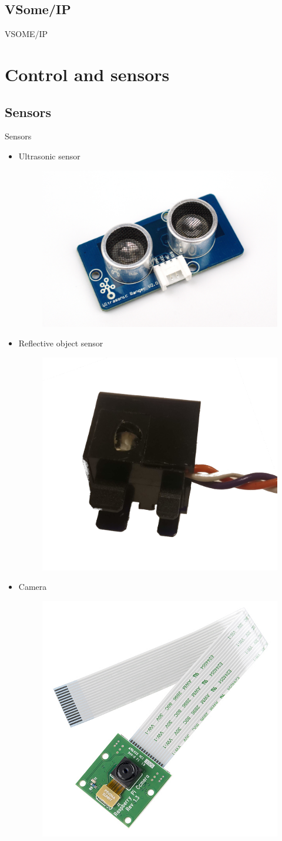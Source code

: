 \documentclass{beamer}
\begin{document}
\subsection{VSome/IP}
\begin{frame}{VSOME/IP}
    
\end{frame}

\section{Control and sensors }
\subsection{Sensors}

\begin{frame}{Sensors}
    \begin{itemize}
     \item Ultrasonic sensor
    \begin{figure}
        \includegraphics[width=0.2\linewidth, left]{ultrasonic.jpg}
    \end{figure}
    \item Reflective object sensor
    \begin{figure}
        \includegraphics[width=0.2\linewidth, left]{ir.jpg}
    \end{figure}
    \item Camera
    \begin{figure}
        \includegraphics[width=0.2\linewidth, left]{camera.jpg}
    \end{figure}

    \end{itemize}

\end{frame}
\end{document}
